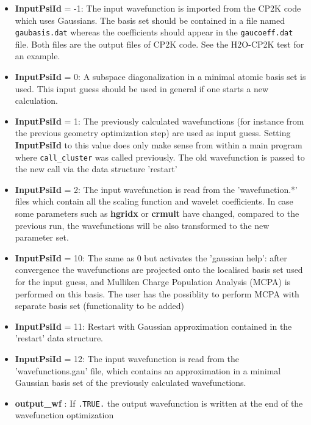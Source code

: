 \documentclass[a4paper,11pt]{report}
\begin{document}
\begin{itemize}
\begin{itemize}
       \item {\bf InputPsiId } = -1: The input wavefunction is imported from the CP2K code which uses Gaussians. 
                                    The basis set should be contained in a file named \texttt{gaubasis.dat} whereas the coefficients should appear in the
                                     \texttt{gaucoeff.dat} file. Both files are the output files of CP2K code. See the H2O-CP2K test for an example.
       \item {\bf InputPsiId } = 0: A subspace diagonalization in a minimal atomic basis set is used. This input guess 
                                    should be used in general if one starts a new calculation. 
       \item {\bf InputPsiId } = 1: The previously calculated wavefunctions (for instance from the previous 
                                    geometry optimization step) are used as input guess. Setting {\bf InputPsiId } to 
                                    this value does only make sense from within a main program where \texttt{call\_cluster} was 
                                    called previously. The old wavefunction is passed to the new call via the data structure 'restart'
       \item {\bf InputPsiId } = 2: The input wavefunction is read from the 'wavefunction.*' files which contain all the 
                                    scaling function and wavelet coefficients. In case some parameters such as {\bf hgridx} 
                                    or {\bf crmult} have changed, compared to the previous run, the wavefunctions will be 
                                    also transformed to the new parameter set.
       \item {\bf InputPsiId } = 10: The same as 0 but activates the 'gaussian help': after convergence the wavefunctions are projected onto the localised basis set used for the input guess, and Mulliken Charge Population Analysis (MCPA) is performed on this basis. The user has the possiblity to perform MCPA with separate basis set (functionality to be added)
       \item {\bf InputPsiId } = 11: Restart with Gaussian approximation contained in the 'restart' data structure.
       \item {\bf InputPsiId } = 12: The input wavefunction is read from the 'wavefunctions.gau'  file, which contains an 
                                    approximation in a minimal Gaussian basis set of the previously calculated wavefunctions.
       \item {\bf output\_wf} : If \texttt{.TRUE.} the output wavefunction is written at the end of the wavefunction optimization 

\end{itemize}
\end{itemize}
\end{document}
